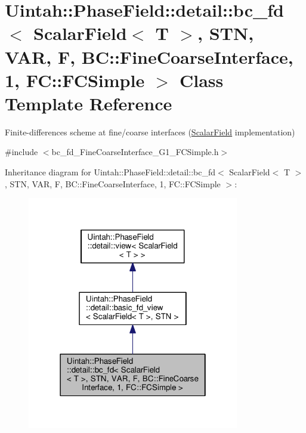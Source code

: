 \hypertarget{classUintah_1_1PhaseField_1_1detail_1_1bc__fd_3_01ScalarField_3_01T_01_4_00_01STN_00_01VAR_00_01ce55d0bf8381798bc129da931b626e80}{}\section{Uintah\+:\+:Phase\+Field\+:\+:detail\+:\+:bc\+\_\+fd$<$ Scalar\+Field$<$ T $>$, S\+TN, V\+AR, F, BC\+:\+:Fine\+Coarse\+Interface, 1, FC\+:\+:F\+C\+Simple $>$ Class Template Reference}
\label{classUintah_1_1PhaseField_1_1detail_1_1bc__fd_3_01ScalarField_3_01T_01_4_00_01STN_00_01VAR_00_01ce55d0bf8381798bc129da931b626e80}


Finite-\/differences scheme at fine/coarse interfaces (\hyperlink{structUintah_1_1PhaseField_1_1ScalarField}{Scalar\+Field} implementation)  




{\ttfamily \#include $<$bc\+\_\+fd\+\_\+\+Fine\+Coarse\+Interface\+\_\+\+G1\+\_\+\+F\+C\+Simple.\+h$>$}



Inheritance diagram for Uintah\+:\+:Phase\+Field\+:\+:detail\+:\+:bc\+\_\+fd$<$ Scalar\+Field$<$ T $>$, S\+TN, V\+AR, F, BC\+:\+:Fine\+Coarse\+Interface, 1, FC\+:\+:F\+C\+Simple $>$\+:\nopagebreak
\begin{figure}[H]
\begin{center}
\leavevmode
\includegraphics[width=262pt]{classUintah_1_1PhaseField_1_1detail_1_1bc__fd_3_01ScalarField_3_01T_01_4_00_01STN_00_01VAR_00_015343226ac19827c6dd09eeb3dfb0ef1f}
\end{center}
\end{figure}


